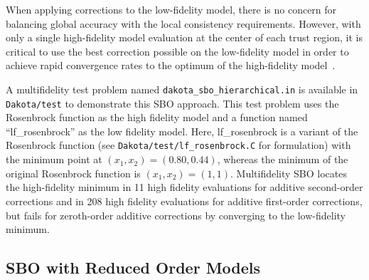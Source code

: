 When applying corrections to the low-fidelity model, there is no
concern for balancing global accuracy with the local consistency
requirements.  However, with only a single high-fidelity model evaluation
at the center of each trust region, it is critical to use the best
correction possible on the low-fidelity model in order to achieve
rapid convergence rates to the optimum of the high-fidelity
model~\cite{Eld04}.


A multifidelity test problem named
\texttt{dakota\_sbo\_hierarchical.in} is available in
\texttt{Dakota/test} to demonstrate this SBO approach. This test
problem uses the Rosenbrock function as the high fidelity model and a
function named ``lf\_rosenbrock'' as the low fidelity model. Here,
lf\_rosenbrock is a variant of the Rosenbrock function (see
\texttt{Dakota/test/lf\_rosenbrock.C} for formulation) with the
minimum point at $(x_1,x_2)=(0.80,0.44)$, whereas the minimum of the
original Rosenbrock function is $(x_1,x_2)=(1,1)$. Multifidelity SBO
locates the high-fidelity minimum in 11 high fidelity evaluations for
additive second-order corrections and in 208 high fidelity evaluations
for additive first-order corrections, but fails for zeroth-order
additive corrections by converging to the low-fidelity minimum.

\subsection{SBO with Reduced Order Models}\label{sbm:sblm:rom}

